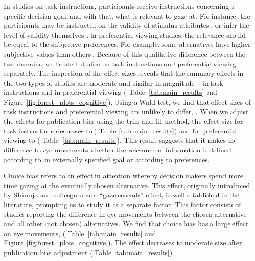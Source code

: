 \documentclass[english,natbib,man,floatsintext]{apa6}
\begin{document}
In studies on task instructions, participants receive instructions concerning a specific decision goal, and with that, what is relevant to gaze at. For instance, the participants may be instructed on the validity of stimulus attributes \citep{krefeld-schwalb2019a}, or infer the level of validity themselves \citep{bialkova2014a}. In preferential viewing studies, the relevance should be equal to the subjective preferences. For example, some alternatives have higher subjective values than others \citep{kim2012a}. Because of this qualitative difference between the two domains, we treated studies on task instructions and preferential viewing separately. 
The inspection of the effect sizes reveals that the summary effects in the two types of studies are moderate and similar in magnitude -- in task instructions  
and in preferential viewing ( Table~\ref{tab:main_results} and Figure~\ref{fig:forest_plots_cognitive}). Using a Wald test, we find that effect sizes of task instructions and preferential viewing are unlikely to differ, . 
When we adjust the effects for publication bias using the trim and fill method, the effect size for task instructions decreases to ( Table~\ref{tab:main_results}) and for preferential viewing to ( Table~\ref{tab:main_results}). This result suggests that it makes no difference to eye movements whether the relevance of information is defined according to an externally specified goal or according to preferences. 

Choice bias refers to an effect in attention whereby decision makers spend more time gazing at the eventually chosen alternative. This effect, originally introduced by Shimojo and colleagues \citep{shimojo2003a} as a ``gaze-cascade'' effect, is well-established in the literature, prompting us to study it as a separate factor. This factor consists of studies reporting the difference in eye movements between the chosen alternative and all other (not chosen) alternatives. We find that choice bias has a large effect on eye movements, ( Table~\ref{tab:main_results} and Figure~\ref{fig:forest_plots_cognitive}). The effect decreases to moderate size after publication bias adjustment ( Table~\ref{tab:main_results})
\end{document}
